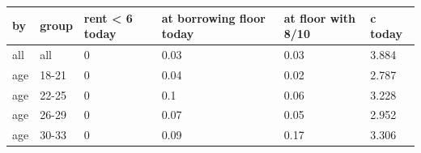 \begingroup\small
\setlength{\tabcolsep}{3pt}
\renewcommand{\arraystretch}{1.04}
\begin{tabularx}{\linewidth}{XXXXXX}
\toprule
by & group & rent \textless{} 6 today & at borrowing floor today & at floor with 8/10 & c today \\
\midrule
all & all & 0 & 0.03 & 0.03 & 3.884 \\
age & 18-21 & 0 & 0.04 & 0.02 & 2.787 \\
age & 22-25 & 0 & 0.1 & 0.06 & 3.228 \\
age & 26-29 & 0 & 0.07 & 0.05 & 2.952 \\
age & 30-33 & 0 & 0.09 & 0.17 & 3.306 \\
\bottomrule
\end{tabularx}
\endgroup
